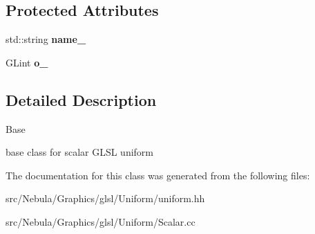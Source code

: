 \subsection*{Protected Attributes}
\begin{DoxyCompactItemize}
\item 
\hypertarget{classNeb_1_1glsl_1_1Uniform_1_1Scalar_1_1Base_af4f8e92fee448c545de153937a419abe}{std\-::string {\bfseries name\-\_\-}}\label{classNeb_1_1glsl_1_1Uniform_1_1Scalar_1_1Base_af4f8e92fee448c545de153937a419abe}

\item 
\hypertarget{classNeb_1_1glsl_1_1Uniform_1_1Scalar_1_1Base_ac57d0525c2866193e87adde9b8ef36fe}{G\-Lint {\bfseries o\-\_\-}}\label{classNeb_1_1glsl_1_1Uniform_1_1Scalar_1_1Base_ac57d0525c2866193e87adde9b8ef36fe}

\end{DoxyCompactItemize}


\subsection{Detailed Description}
Base 

base class for scalar G\-L\-S\-L uniform 

The documentation for this class was generated from the following files\-:\begin{DoxyCompactItemize}
\item 
src/\-Nebula/\-Graphics/glsl/\-Uniform/uniform.\-hh\item 
src/\-Nebula/\-Graphics/glsl/\-Uniform/Scalar.\-cc\end{DoxyCompactItemize}
